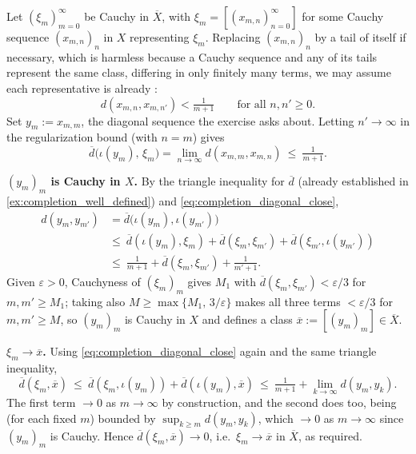 \begin{exercisesolution}
\label{sol:completion_is_complete}
Let $(\xi_m)_{m=0}^\infty$ be Cauchy in $\overline X$, with $\xi_m = [(x_{m,n})_{n=0}^\infty]$ for
some Cauchy sequence $(x_{m,n})_n$ in $X$ representing $\xi_m$. Replacing $(x_{m,n})_n$ by a tail
of itself if necessary, which is harmless because a Cauchy sequence and any of its tails represent
the same class, differing in only finitely many terms, we may assume each representative is already
:
\[d(x_{m,n},x_{m,n'}) < \tfrac1{m+1} \qquad \text{for all } n,n' \geq 0.\]
Set $y_m := x_{m,m}$, the diagonal sequence the exercise asks about. Letting $n'\to\infty$ in the
regularization bound (with $n=m$) gives
\begin{equation}
\overline d\big(\iota(y_m),\,\xi_m\big) = \lim_{n\to\infty} d(x_{m,m},x_{m,n})
  \ \leq\ \tfrac1{m+1}.
\label{eq:completion_diagonal_close}
\end{equation}

\textbf{$(y_m)_m$ is Cauchy in $X$.} By the triangle inequality for $\overline d$ (already
established in \cref{ex:completion_well_defined}) and \eqref{eq:completion_diagonal_close},
\begin{align*}
  d(y_m,y_{m'}) &= \overline d\big(\iota(y_m),\iota(y_{m'})\big) \\
  &\leq\ \overline d(\iota(y_m),\xi_m) + \overline d(\xi_m,\xi_{m'})
         + \overline d(\xi_{m'},\iota(y_{m'})) \\
  &\leq\ \tfrac1{m+1} + \overline d(\xi_m,\xi_{m'}) + \tfrac1{m'+1}.
\end{align*}
Given $\varepsilon>0$, Cauchyness of $(\xi_m)_m$ gives $M_1$ with
$\overline d(\xi_m,\xi_{m'}) < \varepsilon/3$ for $m,m'\geq M_1$; taking also
$M \geq \max\{M_1,\,3/\varepsilon\}$ makes all three terms $< \varepsilon/3$ for $m,m'\geq M$, so
$(y_m)_m$ is Cauchy in $X$ and defines a class $\overline x := [(y_m)_m] \in \overline X$.

\textbf{$\xi_m \to \overline x$.} Using \eqref{eq:completion_diagonal_close} again and the same
triangle inequality,
\[\overline d(\xi_m,\overline x) \ \leq\ \overline d(\xi_m,\iota(y_m)) + \overline d(\iota(y_m),\overline x)
  \ \leq\ \tfrac1{m+1} + \lim_{k\to\infty}d(y_m,y_k).\]
The first term $\to 0$ as $m\to\infty$ by construction, and the second does too, being (for each
fixed $m$) bounded by $\sup_{k\geq m}d(y_m,y_k)$, which $\to0$ as $m\to\infty$ since $(y_m)_m$ is
Cauchy. Hence $\overline d(\xi_m,\overline x) \to 0$, i.e.\ $\xi_m \to \overline x$ in
$\overline X$, as required.
\end{exercisesolution}

